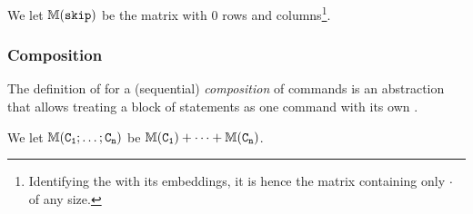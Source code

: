 \begin{definition}[Skip]
    We let $\mathbb{M}(\mathtt{\mathtt{skip}})$ be the matrix with $0$ rows and columns\footnote{Identifying the \SFM with its embeddings, it is hence the matrix containing only \(\cdot\) of any size.}.
\end{definition}
%
%	
%

\subsubsection{Composition}%

The definition of \SFM for a (sequential) \emph{composition} of commands is an abstraction that allows treating a block of statements as one command with its own \SFM.

\begin{definition}[Composition]
    We let	$\mathbb{M}(\mathtt{\mathtt{C_{1}};\dots;\mathtt{C_{n}}})$
    be %
    $\mathbb{M}(\mathtt{C_{1}}) + \cdots + \mathbb{M}(\mathtt{C_{n}})$.
\end{definition}

